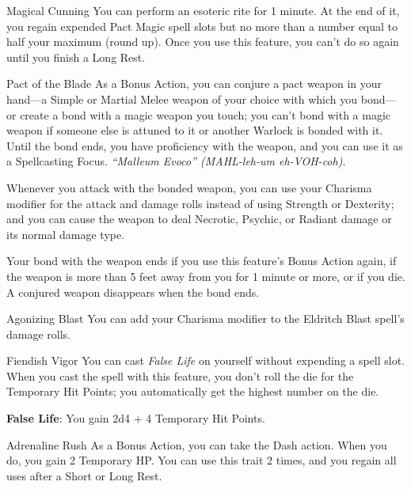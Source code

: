 \newpage


\begin{Card}{Magical Cunning}
You can perform an esoteric rite for 1 minute. At the end of it, you regain expended Pact Magic spell slots but no more than a number equal to half your maximum (round up). Once you use this feature, you can't do so again until you finish a Long Rest.
\end{Card}


\begin{Card}{Pact of the Blade}
As a Bonus Action, you can conjure a pact weapon in your hand—a Simple or Martial Melee weapon of your choice with which you bond—or create a bond with a magic weapon you touch; you can't bond with a magic weapon if someone else is attuned to it or another Warlock is bonded with it. Until the bond ends, you have proficiency with the weapon, and you can use it as a Spellcasting Focus. \textit{“Malleum Evoco” (MAHL-leh-um eh-VOH-coh)}.

Whenever you attack with the bonded weapon, you can use your Charisma modifier for the attack and damage rolls instead of using Strength or Dexterity; and you can cause the weapon to deal Necrotic, Psychic, or Radiant damage or its normal damage type.

Your bond with the weapon ends if you use this feature's Bonus Action again, if the weapon is more than 5 feet away from you for 1 minute or more, or if you die. A conjured weapon disappears when the bond ends.
\end{Card}


\begin{Card}{Agonizing Blast}
You can add your Charisma modifier to the Eldritch Blast spell's damage rolls.
\end{Card}


\begin{Card}{Fiendish Vigor}
You can cast \textit{False Life} on yourself without expending a spell slot. When you cast the spell with this feature, you don't roll the die for the Temporary Hit Points; you automatically get the highest number on the die.

\textbf{False Life}: You gain 2d4 + 4 Temporary Hit Points.
\end{Card}


\begin{Card}{Adrenaline Rush}
As a Bonus Action, you can take the Dash action. When you do, you gain 2 Temporary HP. You can use this trait 2 times, and you regain all uses after a Short or Long Rest.
\end{Card}


